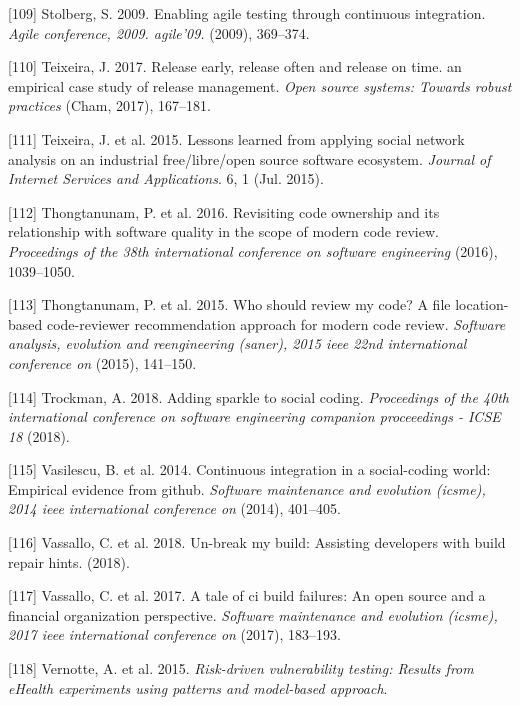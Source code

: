 \documentclass[]{book}
\begin{document}
\hypertarget{ref-stolberg2009enabling}{}
{[}109{]} Stolberg, S. 2009. Enabling agile testing through continuous
integration. \emph{Agile conference, 2009. agile'09.} (2009), 369--374.

\hypertarget{ref-teixeira2017a}{}
{[}110{]} Teixeira, J. 2017. Release early, release often and release on
time. an empirical case study of release management. \emph{Open source
systems: Towards robust practices} (Cham, 2017), 167--181.

\hypertarget{ref-Teixeira2015}{}
{[}111{]} Teixeira, J. et al. 2015. Lessons learned from applying social
network analysis on an industrial free/libre/open source software
ecosystem. \emph{Journal of Internet Services and Applications}. 6, 1
(Jul. 2015).

\hypertarget{ref-thongtanunam2016revisiting}{}
{[}112{]} Thongtanunam, P. et al. 2016. Revisiting code ownership and
its relationship with software quality in the scope of modern code
review. \emph{Proceedings of the 38th international conference on
software engineering} (2016), 1039--1050.

\hypertarget{ref-thongtanunam2015should}{}
{[}113{]} Thongtanunam, P. et al. 2015. Who should review my code? A
file location-based code-reviewer recommendation approach for modern
code review. \emph{Software analysis, evolution and reengineering
(saner), 2015 ieee 22nd international conference on} (2015), 141--150.

\hypertarget{ref-Trockman2018}{}
{[}114{]} Trockman, A. 2018. Adding sparkle to social coding.
\emph{Proceedings of the 40th international conference on software
engineering companion proceeedings - ICSE 18} (2018).

\hypertarget{ref-vasilescu2014continuous}{}
{[}115{]} Vasilescu, B. et al. 2014. Continuous integration in a
social-coding world: Empirical evidence from github. \emph{Software
maintenance and evolution (icsme), 2014 ieee international conference
on} (2014), 401--405.

\hypertarget{ref-vassallo2018break}{}
{[}116{]} Vassallo, C. et al. 2018. Un-break my build: Assisting
developers with build repair hints. (2018).

\hypertarget{ref-vassallo2017tale}{}
{[}117{]} Vassallo, C. et al. 2017. A tale of ci build failures: An open
source and a financial organization perspective. \emph{Software
maintenance and evolution (icsme), 2017 ieee international conference
on} (2017), 183--193.

\hypertarget{ref-vernotte2015}{}
{[}118{]} Vernotte, A. et al. 2015. \emph{Risk-driven vulnerability
testing: Results from eHealth experiments using patterns and model-based
approach}.
\end{document}
